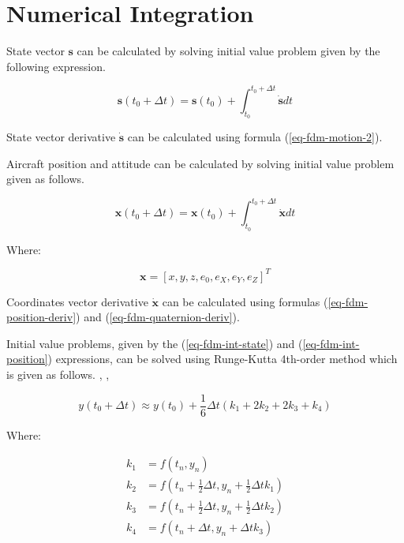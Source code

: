 \section{Numerical Integration}

State vector $\boldsymbol s$ can be calculated by solving initial value problem given by the following expression.

\begin{equation}
  \label{eq-fdm-int-state}
  {\boldsymbol s} \left( t_0 + \Delta t \right)
  =
  {\boldsymbol s} \left( t_0 \right)
  +
  \int_{t_0}^{t_0 + \Delta t} \dot {\boldsymbol s} dt
\end{equation}


State vector derivative $\dot {\boldsymbol s}$ can be calculated using formula (\ref{eq-fdm-motion-2}).

Aircraft position and attitude can be calculated by solving initial value problem given as follows.

\begin{equation}
  \label{eq-fdm-int-position}
  {\boldsymbol x} \left( t_0 + \Delta t \right)
  =
  {\boldsymbol x} \left( t_0 \right)
  +
  \int_{t_0}^{t_0 + \Delta t} \dot {\boldsymbol x} dt
\end{equation}

Where:

\begin{equation}
  {\boldsymbol x}
  =
  \left[
    x, y, z, e_0, e_X, e_Y, e_Z
  \right]^T
\end{equation}

Coordinates vector derivative $\dot {\boldsymbol x}$ can be calculated using formulas (\ref{eq-fdm-position-deriv}) and (\ref{eq-fdm-quaternion-deriv}).

Initial value problems, given by the (\ref{eq-fdm-int-state}) and (\ref{eq-fdm-int-position}) expressions, can be solved using Runge-Kutta 4th-order method which is given as follows. \cite{Press2007}, \cite{Krupowicz1986}, \cite{BaronPiatek2004}

\begin{equation}
  y \left( t_0 + \Delta t \right)
  \approx
  y \left( t_0 \right)
  +
  \frac{1}{6} \Delta t \left( k_1 + 2 k_2 + 2 k_3 + k_4 \right)
\end{equation}

Where:

\begin{align}
  k_1 &=
  f \left( t_n, y_n \right) \\
  k_2 &=
  f \left( t_n + \frac{1}{2} \Delta t, y_n + \frac{1}{2} \Delta t k_1 \right) \\
  k_3 &= 
  f \left( t_n + \frac{1}{2} \Delta t, y_n + \frac{1}{2} \Delta t k_2 \right) \\
  k_4 &= 
  f \left( t_n + \Delta t, y_n + \Delta t k_3 \right) \\
\end{align}
